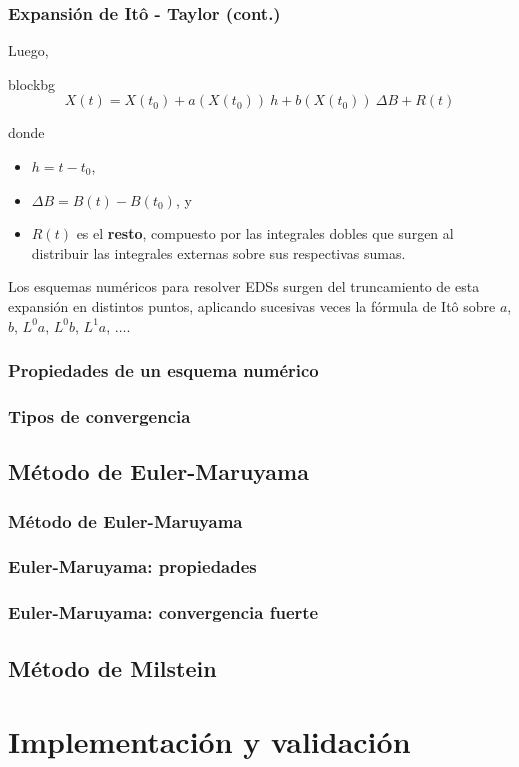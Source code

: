 \documentclass[10pt]{beamer}
\begin{document}
\frame
{
    \frametitle{Expansión de Itô - Taylor (cont.)}

    Luego, \vspace*{0.2cm}

    \begin{beamercolorbox}[wd=1.02\textwidth,ht=0.7cm,rounded=true]{blockbg}
    $$X(t) = X(t_0) + a(X(t_0)) ~h + b(X(t_0)) ~\Delta B + R(t)$$
    \end{beamercolorbox}

    donde
    \begin{itemize}
        \item $h = t - t_0$,
        \item $\Delta B = B(t) - B(t_0)$, y
        \item $R(t)$ es el \textbf{resto}, compuesto por las integrales dobles que surgen al distribuir las integrales
        externas sobre sus respectivas sumas. 
    \end{itemize}

    Los esquemas numéricos para resolver EDSs surgen del truncamiento de esta expansión en distintos
    puntos, aplicando sucesivas veces la fórmula de Itô sobre $a$, $b$, $L^0 a$, $L^0 b$, $L^1 a$, $\dots$. 
}

\frame
{
    \frametitle{Propiedades de un esquema numérico}
}

\frame
{
    \frametitle{Tipos de convergencia}
}

\subsection{Método de Euler-Maruyama}

\frame
{
    \frametitle{Método de Euler-Maruyama}
}

\frame
{
    \frametitle{Euler-Maruyama: propiedades}
}

\frame
{
    \frametitle{Euler-Maruyama: convergencia fuerte}
}


\subsection{Método de Milstein}




\section{Implementación y validación}

\end{document}
